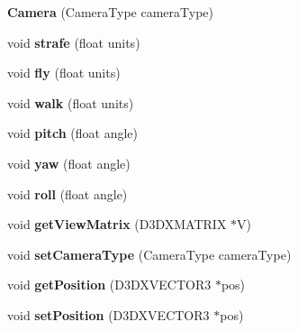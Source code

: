 \begin{DoxyCompactItemize}
\item 
\hypertarget{class_camera_a96588034f9824c5504cec810bd7aa9d7}{{\bfseries Camera} (Camera\-Type camera\-Type)}\label{class_camera_a96588034f9824c5504cec810bd7aa9d7}

\item 
\hypertarget{class_camera_a33abef22b3b0578383870b053654f0b7}{void {\bfseries strafe} (float units)}\label{class_camera_a33abef22b3b0578383870b053654f0b7}

\item 
\hypertarget{class_camera_a9bcca4423ec1d9098d185f9f57fa3f5a}{void {\bfseries fly} (float units)}\label{class_camera_a9bcca4423ec1d9098d185f9f57fa3f5a}

\item 
\hypertarget{class_camera_a87b52396cb7c8f07bb1f383f764308ef}{void {\bfseries walk} (float units)}\label{class_camera_a87b52396cb7c8f07bb1f383f764308ef}

\item 
\hypertarget{class_camera_a49e00b90b94853e4485a6bdf063796de}{void {\bfseries pitch} (float angle)}\label{class_camera_a49e00b90b94853e4485a6bdf063796de}

\item 
\hypertarget{class_camera_ab4eab94754431725c572d528a07a35cc}{void {\bfseries yaw} (float angle)}\label{class_camera_ab4eab94754431725c572d528a07a35cc}

\item 
\hypertarget{class_camera_a72be99f88b1cc21122178109d3441818}{void {\bfseries roll} (float angle)}\label{class_camera_a72be99f88b1cc21122178109d3441818}

\item 
\hypertarget{class_camera_aebdb20cc455865abfbda1bc3f1452c5d}{void {\bfseries get\-View\-Matrix} (D3\-D\-X\-M\-A\-T\-R\-I\-X $\ast$V)}\label{class_camera_aebdb20cc455865abfbda1bc3f1452c5d}

\item 
\hypertarget{class_camera_abade694c882fe630b65dc78db3bec6fc}{void {\bfseries set\-Camera\-Type} (Camera\-Type camera\-Type)}\label{class_camera_abade694c882fe630b65dc78db3bec6fc}

\item 
\hypertarget{class_camera_a340c68c887d1c5091a571ac9985510db}{void {\bfseries get\-Position} (D3\-D\-X\-V\-E\-C\-T\-O\-R3 $\ast$pos)}\label{class_camera_a340c68c887d1c5091a571ac9985510db}

\item 
\hypertarget{class_camera_a86aeb83413ed7e07793471d493336c54}{void {\bfseries set\-Position} (D3\-D\-X\-V\-E\-C\-T\-O\-R3 $\ast$pos)}\label{class_camera_a86aeb83413ed7e07793471d493336c54}


\end{DoxyCompactItemize}
